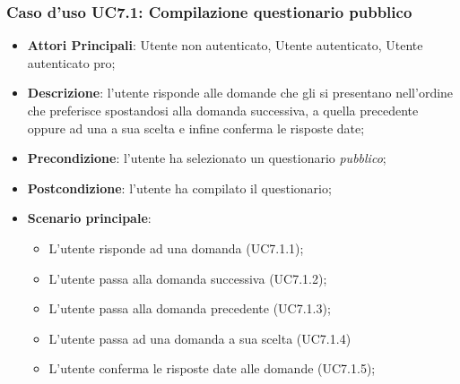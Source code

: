 \subsubsection{Caso d'uso UC7.1: Compilazione questionario pubblico}
\begin{itemize}
\item\textbf{Attori Principali}: Utente non autenticato, Utente autenticato, Utente autenticato pro;
\item\textbf{Descrizione}: l'utente risponde alle domande che gli si presentano nell'ordine che preferisce spostandosi alla domanda successiva, a quella precedente oppure ad una a sua scelta e infine conferma le risposte date;
\item\textbf{Precondizione}: l'utente ha selezionato un questionario \textit{pubblico};
\item\textbf{Postcondizione}: l'utente ha compilato il questionario;
\item\textbf{Scenario principale}:
\begin{itemize}
\item L'utente risponde ad una domanda (UC7.1.1);
\item L'utente passa alla domanda successiva (UC7.1.2);
\item L'utente passa alla domanda precedente (UC7.1.3);
\item L'utente passa ad una domanda a sua scelta (UC7.1.4)
\item L'utente conferma le risposte date alle domande (UC7.1.5);
\end{itemize}
\end{itemize}

